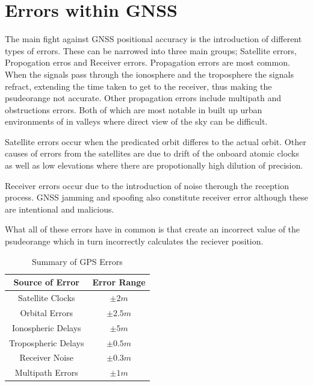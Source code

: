 \section{Errors within GNSS}
The main fight against GNSS positional accuracy is the introduction of different types of errors. These can be narrowed into three main groups; Satellite errors,
Propogation erros and Receiver errors. Propagation errors are most common. When the signals pass through the ionosphere and the troposphere the signals refract, extending
the time taken to get to the receiver, thus making the psudeorange not accurate. Other propagation errors include multipath and obstructions errors. Both of which are
most notable in built up urban environments of in valleys where direct view of the sky can be difficult.

Satellite errors occur when the predicated orbit differes to the actual orbit. Other causes of errors from the satellites are due to drift of the onboard atomic clocks as
well as low elevations where there are propotionally high dilution of precision.

Receiver errors occur due to the introduction of noise therough the reception process. GNSS jamming and spoofing also constitute receiver error although these are
intentional and malicious.

What all of these errors have in common is that create an incorrect value of the psudeorange which in turn incorrectly calculates the reciever position.
\renewcommand{\arraystretch}{1.5}
\begin{table}
    \begin{center}
        \caption{Summary of GPS Errors}
        \label{tab:GPS Errors}
        \begin{tabular}{ |c|c| }
            \hline
            \textbf{Source of Error} & \textbf{Error Range} \\
            \hline
            Satellite Clocks & $\pm 2m$\\
            \hline
            Orbital Errors & $\pm 2.5m$\\
            \hline
            Ionospheric Delays & $\pm 5m$\\
            \hline
            Tropospheric Delays & $\pm 0.5m$\\
            \hline
            Receiver Noise & $\pm 0.3m$\\
            \hline
            Multipath Errors & $\pm 1m$\\
            \hline
        \end{tabular}
    \end{center}
\end{table}
\renewcommand{\arraystretch}{1}

